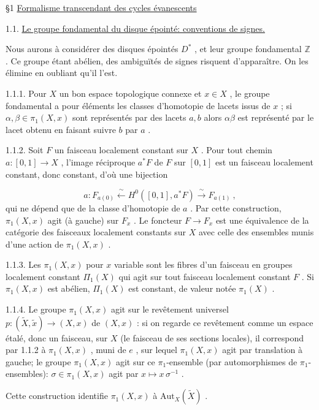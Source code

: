 \S 1 \underline{Formalisme transcendant des cycles évanescents}


1.1. \underline{Le groupe fondamental du disque épointé: conventions de signes.}

Nous aurons à considérer des disques épointés $D^*$ , et leur groupe fondamental $\mathbb{Z}$ . Ce groupe étant abélien, des ambiguïtés de signes risquent d'apparaître. On les élimine en oubliant qu'il l'est.

1.1.1. Pour $X$ un bon espace topologique connexe et $x \in X$ , le groupe fondamental a pour éléments les classes d'homotopie de lacets issus de $x$ ; si $\alpha, \beta \in \pi_1(X, x)$ sont représentés par des lacets $a, b$ alors $\alpha \beta$ est représenté par le lacet obtenu en faisant suivre $b$ par $a$ .

1.1.2. Soit $F$ un faisceau localement constant sur $X$ . Pour tout chemin $a : [0, 1] \to X$ , l'image réciproque $a^*F$ de $F$ sur $[0, 1]$ est un faisceau localement constant, donc constant, d'où une bijection

\begin{equation*}
a : F_{a(0)} \xleftarrow{\ \sim\ } H^0([0, 1], a^*F) \xrightarrow{\ \sim\ } F_{a(1)} \ ,
\end{equation*}
qui ne dépend que de la classe d'homotopie de $a$ . Par cette construction, $\pi_1(X, x)$ agit (à gauche) sur $F_x$ . Le foncteur $F \to F_x$ est une équivalence de la catégorie des faisceaux localement constants sur $X$ avec celle des ensembles munis d'une action de $\pi_1(X, x)$ .

1.1.3. Les $\pi_1(X, x)$ pour $x$ variable sont les fibres d'un faisceau en groupes localement constant $\Pi_1(X)$ qui agit sur tout faisceau localement constant $F$ . Si $\pi_1(X, x)$ est abélien, $\Pi_1(X)$ est constant, de valeur notée $\pi_1(X)$ .

1.1.4. Le groupe $\pi_1(X, x)$ agit sur le revêtement universel $p : (\tilde{X}, \tilde{x}) \to (X, x)$ de $(X, x)$ : si on regarde ce revêtement comme un espace étalé, donc un faisceau, sur $X$ (le faisceau de ses sections locales), il correspond par 1.1.2 à $\pi_1(X, x)$ ,
muni de $e$ , sur lequel $\pi_1(X, x)$ agit par translation à gauche; le groupe $\pi_1(X, x)$ agit sur ce $\pi_1$-ensemble (par automorphismes de $\pi_1$-ensembles): $\sigma \in \pi_1(X, x)$ agit par $x \longmapsto x\,\sigma^{-1}$ .

Cette construction identifie $\pi_1(X, x)$ à $\mathrm{Aut}_X(\tilde{X})$ .

